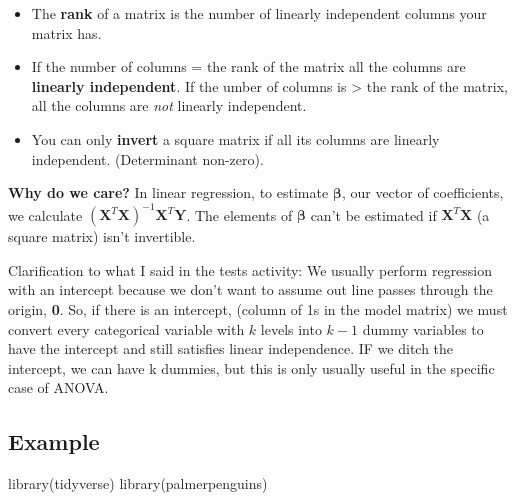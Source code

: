 \documentclass[
]{book}
\newenvironment{Shaded}{\begin{snugshade}}{\end{snugshade}}
\newcommand{\FunctionTok}[1]{\textcolor[rgb]{0.00,0.00,0.00}{#1}}
\newcommand{\NormalTok}[1]{#1}
\providecommand{\tightlist}{%
  \setlength{\itemsep}{0pt}\setlength{\parskip}{0pt}}
\begin{document}
\begin{itemize}
\tightlist
\item
  The \textbf{rank} of a matrix is the number of linearly independent columns your matrix has.\\
\item
  If the number of columns = the rank of the matrix all the columns are \textbf{linearly independent}. If the umber of columns is \textgreater{} the rank of the matrix, all the columns are \emph{not} linearly independent.\\
\item
  You can only \textbf{invert} a square matrix if all its columns are linearly independent. (Determinant non-zero).
\end{itemize}

\textbf{Why do we care?} In linear regression, to estimate \(\boldsymbol\beta\), our vector of coefficients, we calculate \((\boldsymbol X^T\boldsymbol X)^{-1}\boldsymbol X^T\boldsymbol Y\). The elements of \(\boldsymbol\beta\) can't be estimated if \(\boldsymbol X^T\boldsymbol X\) (a square matrix) isn't invertible.

Clarification to what I said in the tests activity: We usually perform regression with an intercept because we don't want to assume out line passes through the origin, \textbf{0}. So, if there is an intercept, (column of 1s in the model matrix) we must convert every categorical variable with \(k\) levels into \(k-1\) dummy variables to have the intercept and still satisfies linear independence. IF we ditch the intercept, we can have k dummies, but this is only usually useful in the specific case of ANOVA.

\hypertarget{example}{%
\subsection{Example}\label{example}}

\begin{Shaded}
\begin{Highlighting}[]
\FunctionTok{library}\NormalTok{(tidyverse)}
\FunctionTok{library}\NormalTok{(palmerpenguins)}
\end{Highlighting}
\end{Shaded}
\end{document}

